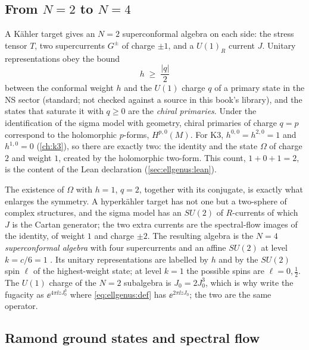\subsection{From \texorpdfstring{$N=2$}{N = 2} to \texorpdfstring{$N=4$}{N = 4}}

A Kähler target gives an $N=2$ superconformal algebra on each side: the stress tensor $T$,
two supercurrents $G^\pm$ of charge $\pm1$, and a $U(1)_R$ current $J$. Unitary
representations obey the bound
\begin{equation}\label{eq:ellgenus:bps}
 h\;\ge\;\frac{|q|}{2}
\end{equation}
between the conformal weight $h$ and the $U(1)$ charge $q$ of a primary state in the NS
sector (standard; not checked against a source in this book's library), and the states that
saturate it with $q\ge0$ are the \emph{chiral primaries}. Under the identification of the
sigma model with geometry, chiral primaries of charge $q=p$ correspond to the holomorphic
$p$-forms, $H^{p,0}(M)$. For K3, $h^{0,0}=h^{2,0}=1$ and $h^{1,0}=0$ (\cref{ch:k3}), so there
are exactly two: the identity and the state $\Omega$ of charge $2$ and weight $1$, created by
the holomorphic two-form. This count, $1+0+1=2$, is the content of the Lean declaration
 (\cref{sec:ellgenus:lean}).

The existence of $\Omega$ with $h=1$, $q=2$, together with its conjugate, is exactly what
enlarges the symmetry. A hyperk\"ahler target has not one but a two-sphere of complex
structures, and the sigma model has an $SU(2)$ of $R$-currents of which $J$ is the Cartan
generator; the two extra currents are the spectral-flow images of the identity, of weight $1$
and charge $\pm2$. The resulting algebra is the \emph{$N=4$ superconformal algebra}
 with four supercurrents and an
affine $SU(2)$ at level $k=c/6=1$ . Its unitary representations
are labelled by $h$ and by the $SU(2)$ spin $\ell$ of the highest-weight state; at level
$k=1$ the possible spins are $\ell=0,\tfrac12$. The $U(1)$ charge of the $N=2$ subalgebra is
$J_0=2J_0^3$, which is why  write the fugacity as
$\ee^{4\pi\ii zJ^3_0}$ where \eqref{eq:ellgenus:def} has $\ee^{2\pi\ii zJ_0}$; the two are the
same operator.

\subsection{Ramond ground states and spectral flow}

